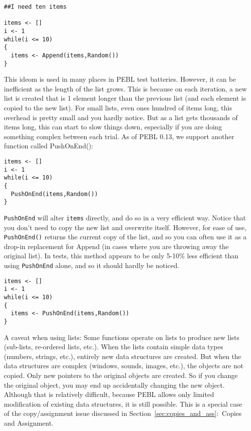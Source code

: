 \begin{verbatim}
##I need ten items

items <- []
i <- 1
while(i <= 10)
{
  items <- Append(items,Random())
}
\end{verbatim}

This ideom is used in many places in PEBL test batteries.  However, it can be inefficient as the length of the list grows.  This is because on each iteration, a new list is created that is 1 element longer than the previous list (and each element is copied to the new list).  For small lists, even ones hundred of items long, this overhead is pretty small and you hardly notice.  But as a list gets thousands of items long, this can start to slow things down, especially if you are doing something complex between each trial. As of PEBL 0.13, we support another function called PushOnEnd():
\begin{verbatim}
items <- []
i <- 1
while(i <= 10)
{
  PushOnEnd(items,Random())
}
\end{verbatim}

\texttt{PushOnEnd} will alter \texttt{items} directly, and do so in a very efficient way.  Notice that you don't need to copy the new list and overwrite itself.  However, for ease of use, \texttt{PushOnEnd()} returns the current copy of the list, and so you can often use it as a drop-in replacement for Append (in cases where you are throwing away the original list).  In tests, this method appears to be only 5-10\% less efficient than using \texttt{PushOnEnd} alone, and so it should hardly be noticed.

\begin{verbatim}
items <- []
i <- 1
while(i <= 10)
{
  items <- PushOnEnd(items,Random())
}
\end{verbatim}

A caveat when using lists: Some functions operate on lists to produce
new lists (sub-lists, re-ordered lists, etc.). When the lists contain
simple data types (numbers, strings, etc.), entirely new data
structures are created. But when the data structures are complex
(windows, sounds, images, etc.), the objects are not copied. Only new
pointers to the original objects are created. So if you change the
original object, you may end up accidentally changing the new
object. Although that is relatively difficult, because PEBL allows
only limited modification of existing data structures, it is still
possible. This is a special case of the copy/assignment issue
discussed in Section~\ref{sec:copies_and_ass}:~Copies and Assignment.

